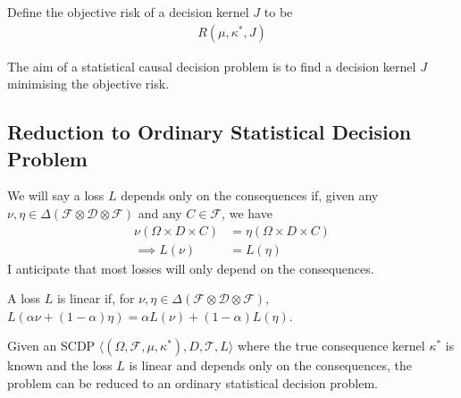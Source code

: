 Define the objective risk of a decision kernel $J$ to be
\begin{align}
    R(\mu,\kappa^*,J) \label{eq:objective_risk}
\end{align}

The aim of a statistical causal decision problem is to find a decision kernel $J$ minimising the objective risk.

\subsection{Reduction to Ordinary Statistical Decision Problem}



\begin{definition}
We will say a loss $L$ depends only on the consequences if, given any $\nu,\eta\in \Delta(\mathcal{F}\otimes\mathcal{D}\otimes\mathcal{F})$ and any $C\in \mathcal{F}$, we have
\begin{align}
    \nu(\Omega\times D\times C) &= \eta(\Omega\times D\times C) \\
    \implies L(\nu) &= L(\eta)
\end{align}
I anticipate that most losses will only depend on the consequences.
\end{definition}

\begin{definition}
A loss $L$ is linear if, for $\nu,\eta\in \Delta(\mathcal{F}\otimes\mathcal{D}\otimes\mathcal{F})$, $L(\alpha\nu + (1-\alpha)\eta) = \alpha L(\nu) + (1-\alpha) L(\eta)$.
\end{definition}

\begin{theorem}\label{th:id_scdp}
Given an SCDP $\langle (\Omega,\mathcal{F},\mu,\kappa^*), D, \mathscr{T}, L\rangle$ where the true consequence kernel $\kappa^*$ is known and the loss $L$ is linear and depends only on the consequences, the problem can be reduced to an ordinary statistical decision problem.
\end{theorem}


